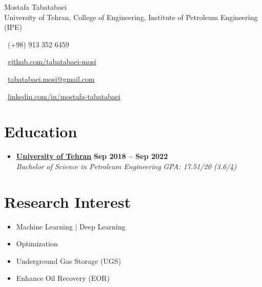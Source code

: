 \documentclass[a4paper, 11pt, sans]{article}
\newcommand{\resumeSubheadingmosi}[4]{
	\vspace{-1pt}\item
	\textbf{#1} \hfill \textbf{\small #2} \\
	\textit{\small#3} \hfill \textit{\small #4} \\
	\vspace{2pt}
}
\newcommand{\resumeSubHeadingListStart}{\begin{itemize}[leftmargin=0.0in, label={}]}
\newcommand{\resumeSubHeadingListEnd}{\end{itemize}}
\newcommand*{\authorimg}[1]{%
	\raisebox{-.3\baselineskip}{%
		\texttt{[image: \#1]}%
	}%
}
\begin{document}
	
	\begin{center}
		
		{\Huge Mostafa Tabatabaei} \\ \vspace{2pt} 
		University of Tehran, College of Engineering, Institute of Petroleum Engineering (IPE)
		\vspace{5pt}
		

		\begin{multicols}{2}
			\small\faPhone\ (+98) 913 352 6459
			
			\faGithub\ \href{https://github.com/tabatabaei-mosi}{github.com/tabatabaei-mosi}
			
			\faEnvelope\ \href{mailto:tabatabaei.mosi@gmail.com}{tabatabaei.mosi@gmail.com}
			
			\faLinkedin\ \href{https://www.linkedin.com/in/mostafa-tabatabaei-33250519a}{linkedin.com/in/mostafa-tabatabaei}
			
			\vspace{8pt}
		\end{multicols}

	\end{center}
	
	
\section{Education}
	\resumeSubHeadingListStart
	\resumeSubheadingmosi
	{\authorimg{images/UT.png} \href{https://www.ut.ac.ir/en}{University of Tehran}}{Sep 2018 -- Sep 2022}
	{\hspace{0.65cm}Bachelor of Science in Petroleum Engineering}{GPA: 17.51/20 (3.6/4)}
	\resumeSubHeadingListEnd
	
	
	
\section{Research Interest}
	 \begin{multicols}{2}
		\begin{itemize}[itemsep=-2pt, parsep=3pt]
			\item \small Machine Learning $|$ Deep Learning 
			\item \small Optimization
			\item \small Underground Gas Storage (UGS)
			\item \small Enhance Oil Recovery (EOR)
		\end{itemize}
		 \end{multicols}
	
\end{document}
